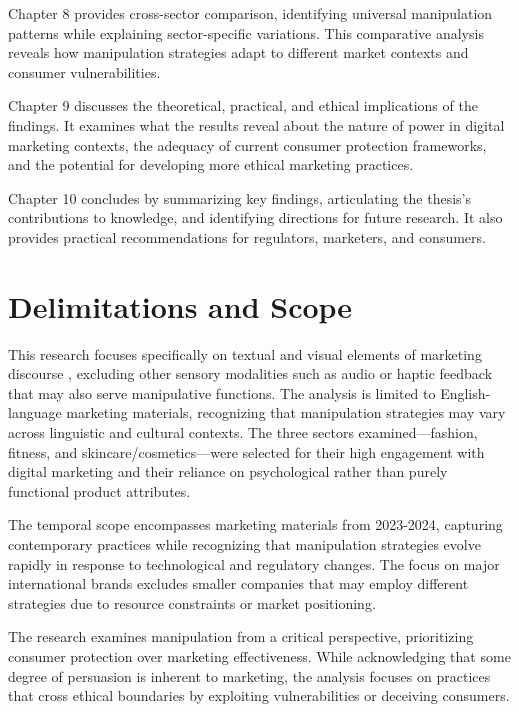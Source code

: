 Chapter 8 provides cross-sector comparison, identifying universal manipulation patterns while explaining sector-specific variations. This comparative analysis reveals how manipulation strategies adapt to different market contexts and consumer vulnerabilities.

Chapter 9 discusses the theoretical, practical, and ethical implications of the findings. It examines what the results reveal about the nature of power in digital marketing contexts, the adequacy of current consumer protection frameworks, and the potential for developing more ethical marketing practices.

Chapter 10 concludes by summarizing key findings, articulating the thesis's contributions to knowledge, and identifying directions for future research. It also provides practical recommendations for regulators, marketers, and consumers.

\section{Delimitations and Scope}
\label{sec:delimitations}

This research focuses specifically on textual and visual elements of marketing discourse \cite{fairclough2015language}, excluding other sensory modalities such as audio or haptic feedback that may also serve manipulative functions. The analysis is limited to English-language marketing materials, recognizing that manipulation strategies may vary across linguistic and cultural contexts. The three sectors examined—fashion, fitness, and skincare/cosmetics—were selected for their high engagement with digital marketing and their reliance on psychological rather than purely functional product attributes.

The temporal scope encompasses marketing materials from 2023-2024, capturing contemporary practices while recognizing that manipulation strategies evolve rapidly in response to technological and regulatory changes. The focus on major international brands excludes smaller companies that may employ different strategies due to resource constraints or market positioning.

The research examines manipulation from a critical perspective, prioritizing consumer protection over marketing effectiveness. While acknowledging that some degree of persuasion is inherent to marketing, the analysis focuses on practices that cross ethical boundaries by exploiting vulnerabilities or deceiving consumers.

